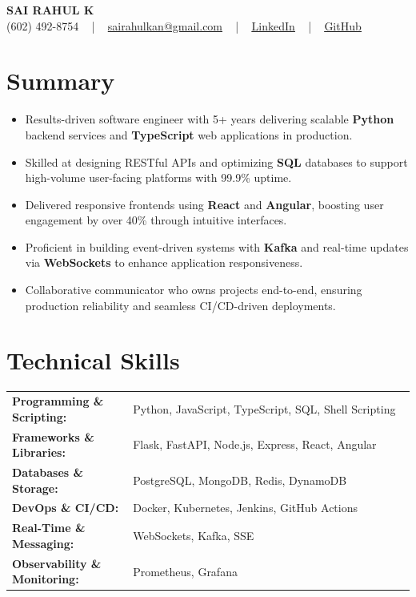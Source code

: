 \documentclass[letterpaper,11pt]{article}
\newcommand{\resumeItem}[1]{
  \item\footnotesize{
    {#1 \vspace{-2pt}}
  }
}
\newcommand{\resumeItemListStart}{\begin{itemize}[leftmargin=*]}
\newcommand{\resumeItemListEnd}{\end{itemize}\vspace{-5pt}}
\begin{document}
\begin{center}
    {\fontsize{14pt}{12pt}\selectfont \textbf{\MakeUppercase{Sai Rahul K}}}\\ \vspace{2pt}
    \fontsize{10pt}{12pt}\selectfont (602) 492-8754 ~ | ~ \href{mailto:sairahulkan@gmail.com}{sairahulkan@gmail.com} ~ | ~
    \href{https://www.linkedin.com/in/rq123/}{\color{blue}\underline{LinkedIn}} ~ | ~
    \href{https://github.com/kanrahuldo}{\color{blue}\underline{GitHub}}~
    \vspace{-8pt}
\end{center}

\section{Summary}
\fontsize{9pt}{10pt}\selectfont
\resumeItemListStart
    \resumeItem{Results-driven software engineer with 5+ years delivering scalable \textbf{Python} backend services and \textbf{TypeScript} web applications in production.}
    \resumeItem{Skilled at designing RESTful APIs and optimizing \textbf{SQL} databases to support high-volume user-facing platforms with 99.9\% uptime.}
    \resumeItem{Delivered responsive frontends using \textbf{React} and \textbf{Angular}, boosting user engagement by over 40\% through intuitive interfaces.}
    \resumeItem{Proficient in building event-driven systems with \textbf{Kafka} and real-time updates via \textbf{WebSockets} to enhance application responsiveness.}
    \resumeItem{Collaborative communicator who owns projects end-to-end, ensuring production reliability and seamless CI/CD-driven deployments.}
\resumeItemListEnd
\vspace{-6pt}

\section{Technical Skills}
        \vspace{-14pt}
        \begin{table}[h]
            \fontsize{9pt}{10pt}\selectfont
            \begin{tabular}{p{0.3\linewidth} p{0.7\linewidth}}
                \textbf{Programming \& Scripting:} & Python, JavaScript, TypeScript, SQL, Shell Scripting \\
                \textbf{Frameworks \& Libraries:} & Flask, FastAPI, Node.js, Express, React, Angular \\
                \textbf{Databases \& Storage:} & PostgreSQL, MongoDB, Redis, DynamoDB \\
                \textbf{DevOps \& CI/CD:} & Docker, Kubernetes, Jenkins, GitHub Actions \\
                \textbf{Real-Time \& Messaging:} & WebSockets, Kafka, SSE \\
                \textbf{Observability \& Monitoring:} & Prometheus, Grafana \\
            \end{tabular}
        \end{table}
    \vspace{-15pt}
\end{document}
